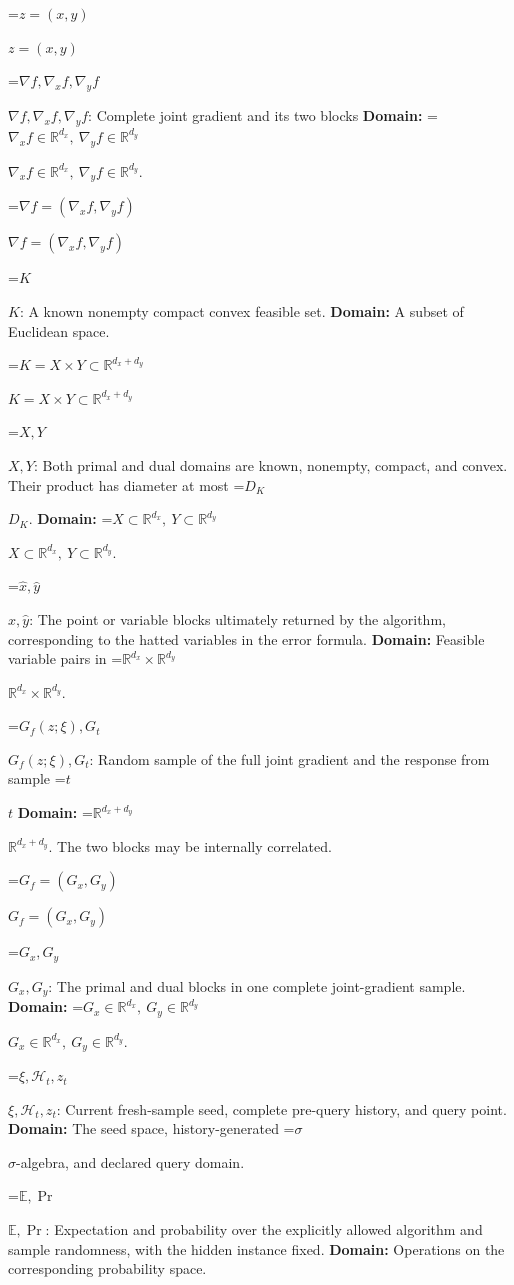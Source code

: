 \documentclass[10pt,a4paper]{article}
\newcommand{\AtlasMath}[1]{\par\begingroup\centering\setbox0=\hbox{$\displaystyle #1$}\ifdim\wd0>1.4\linewidth\typeout{ATLAS WIDE FORMULA: \the\wd0}\fi\ifdim\wd0>\linewidth\resizebox{\linewidth}{!}{\box0}\else\box0\fi\par\endgroup}
\newcommand{\AtlasInlineMath}[1]{\begingroup\setbox0=\hbox{$#1$}\ifdim\wd0>.4\linewidth\endgroup\AtlasMath{#1}\else\endgroup$#1$\fi}
\begin{document}
\AtlasInlineMath{z=(x,y)}



\AtlasInlineMath{\nabla f,\nabla_x f,\nabla_y f}: Complete joint gradient and its two blocks \textbf{Domain:} \AtlasInlineMath{\nabla_x f\in\mathbb R^{d_x},\ \nabla_y f\in\mathbb R^{d_y}}.



\AtlasInlineMath{\nabla f=(\nabla_x f,\nabla_y f)}



\AtlasInlineMath{K}: A known nonempty compact convex feasible set. \textbf{Domain:} A subset of Euclidean space.



\AtlasInlineMath{K=X\times Y\subset\mathbb R^{d_x+d_y}}



\AtlasInlineMath{X,Y}: Both primal and dual domains are known, nonempty, compact, and convex. Their product has diameter at most \AtlasInlineMath{D_K}. \textbf{Domain:} \AtlasInlineMath{X\subset\mathbb R^{d_x},\ Y\subset\mathbb R^{d_y}}.



\AtlasInlineMath{\widehat x,\widehat y}: The point or variable blocks ultimately returned by the algorithm, corresponding to the hatted variables in the error formula. \textbf{Domain:} Feasible variable pairs in \AtlasInlineMath{\mathbb R^{d_x}\times\mathbb R^{d_y}}.



\AtlasInlineMath{G_f(z;\xi),G_t}: Random sample of the full joint gradient and the response from sample \AtlasInlineMath{t} \textbf{Domain:} \AtlasInlineMath{\mathbb R^{d_x+d_y}}. The two blocks may be internally correlated.



\AtlasInlineMath{G_f=(G_x,G_y)}



\AtlasInlineMath{G_x,G_y}: The primal and dual blocks in one complete joint-gradient sample. \textbf{Domain:} \AtlasInlineMath{G_x\in\mathbb R^{d_x},\ G_y\in\mathbb R^{d_y}}.



\AtlasInlineMath{\xi,\mathcal H_t,z_t}: Current fresh-sample seed, complete pre-query history, and query point. \textbf{Domain:} The seed space, history-generated \AtlasInlineMath{\sigma}-algebra, and declared query domain.



\AtlasInlineMath{\mathbb E,\Pr}: Expectation and probability over the explicitly allowed algorithm and sample randomness, with the hidden instance fixed. \textbf{Domain:} Operations on the corresponding probability space.
\end{document}
